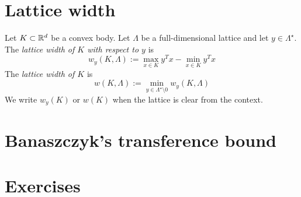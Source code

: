 \section{Lattice width}

\begin{definition}
  Let $K \subset \mathbb{R}^d$ be a convex body.
  Let $\Lambda$ be a full-dimensional lattice and let $y \in \Lambda^\star$.
  The \emph{lattice width of $K$ with respect to $y$} is
  \[
    w_y(K, \Lambda) := \max_{x \in K} y^T x - \min_{x \in K} y^T x
  \]
  The \emph{lattice width of $K$} is
  \[
    w(K, \Lambda) := \min_{y \in \Lambda^\star \setminus 0} w_y(K,\Lambda)
  \]
  We write $w_y(K)$ or $w(K)$ when the lattice is clear from the context.
\end{definition}



\section{Banaszczyk's transference bound}
\label{sec:transference-bound-banaszczyk}


\section*{Exercises}

